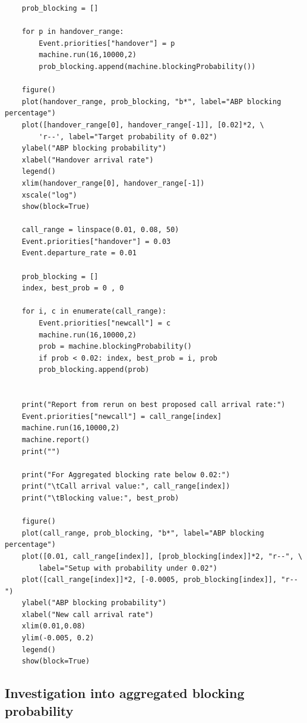 \documentclass{ecmm427_assignment}
\begin{document}
\begin{verbatim}
    prob_blocking = []

    for p in handover_range:
        Event.priorities["handover"] = p
        machine.run(16,10000,2)
        prob_blocking.append(machine.blockingProbability())

    figure()
    plot(handover_range, prob_blocking, "b*", label="ABP blocking percentage")
    plot([handover_range[0], handover_range[-1]], [0.02]*2, \
        'r--', label="Target probability of 0.02")
    ylabel("ABP blocking probability")
    xlabel("Handover arrival rate")
    legend()
    xlim(handover_range[0], handover_range[-1])
    xscale("log")
    show(block=True)

    call_range = linspace(0.01, 0.08, 50)
    Event.priorities["handover"] = 0.03
    Event.departure_rate = 0.01

    prob_blocking = []
    index, best_prob = 0 , 0

    for i, c in enumerate(call_range):
        Event.priorities["newcall"] = c
        machine.run(16,10000,2)
        prob = machine.blockingProbability()
        if prob < 0.02: index, best_prob = i, prob
        prob_blocking.append(prob)
    

    print("Report from rerun on best proposed call arrival rate:")
    Event.priorities["newcall"] = call_range[index]
    machine.run(16,10000,2)
    machine.report()
    print("")
    
    print("For Aggregated blocking rate below 0.02:")
    print("\tCall arrival value:", call_range[index])
    print("\tBlocking value:", best_prob)

    figure()
    plot(call_range, prob_blocking, "b*", label="ABP blocking percentage")
    plot([0.01, call_range[index]], [prob_blocking[index]]*2, "r--", \
        label="Setup with probability under 0.02")
    plot([call_range[index]]*2, [-0.0005, prob_blocking[index]], "r--")
    ylabel("ABP blocking probability")
    xlabel("New call arrival rate")
    xlim(0.01,0.08)
    ylim(-0.005, 0.2)
    legend()
    show(block=True)
\end{verbatim}

\subsection{Investigation into aggregated blocking probability}
\end{document}
